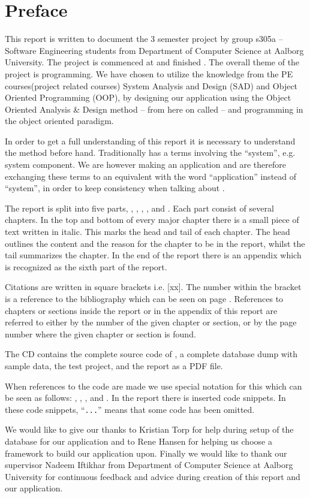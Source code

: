 \chapter*{Preface}
\label{chap:preface}
%
\emptyTop{}%
\vspace{-15mm}%
This report is written to document the 3\rd{} semester project by group s305a -- Software Engineering students from Department of Computer Science at Aalborg University. 
The project is commenced at  and finished .
The overall theme of the project is programming. 
We have chosen to utilize the knowledge from the PE courses(project related courses) System Analysis and Design (SAD) and Object Oriented Programming (OOP), by designing our application using the Object Oriented Analysis \& Design method -- from here on called \ooad[] -- and programming \hdesk[] in the object oriented paradigm.

In order to get a full understanding of this report it is necessary to understand the \ooad[] method before hand.
Traditionally \ooad[] has a terms involving the ``system'', e.g. system component.
We are however making an application and are therefore exchanging these terms to an equivalent with the word ``application'' instead of ``system'', in order to keep consistency when talking about \hdesk[].

The report is split into five parts, , , , , and .
Each part consist of several chapters.
In the top and bottom of every major chapter there is a small piece of text written in italic.
This marks the head and tail of each chapter.
The head outlines the content and the reason for the chapter to be in the report, whilst the tail summarizes the chapter.
In the end of the report there is an appendix which is recognized as the sixth part of the report.

Citations are written in square brackets i.e. [xx].
The number within the bracket is a reference to the bibliography which can be seen on page \pageref{chap:bib}.
References to chapters or sections inside the report or in the appendix of this report are referred to either by the number of the given chapter or section, or by the page number where the given chapter or section is found.

The CD contains the complete source code of \hdesk[], a complete database dump with sample data, the test project, and the report as a PDF file.  

When references to the code are made we use special notation for this which can be seen as follows: , , , and .
In the report there is inserted code snippets.
In these code snippets, ``\verb|...|'' means that some code has been omitted.

We would like to give our thanks to Kristian Torp for help during setup of the database for our application and to Rene Hansen for helping us choose a framework to build our application upon.
Finally we would like to thank our supervisor Nadeem Iftikhar from Department of Computer Science at Aalborg University for continuous feedback and advice during creation of this report and our application.